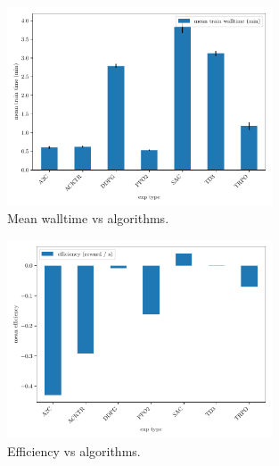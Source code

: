 \documentclass{article}
\begin{document}
\begin{figure}[H]
    \centering
    \includegraphics[width=0.7\textwidth]{../mean_walltime.pdf}
\caption{Mean walltime vs algorithms.}
\end{figure}


\begin{figure}[H]
    \centering
    \includegraphics[width=0.7\textwidth]{../efficiency.pdf}
\caption{Efficiency vs algorithms.}
\end{figure}
\end{document}
